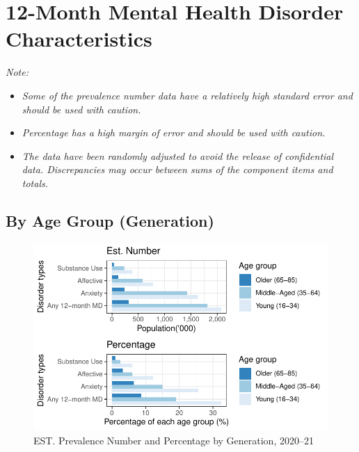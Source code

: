 \documentclass[
  a4paper,
  DIV=11,
  numbers=noendperiod]{scrreport}
\begin{document}
\hypertarget{month-mental-health-disorder-characteristics}{%
\section{12-Month Mental Health Disorder
Characteristics}\label{month-mental-health-disorder-characteristics}}

\emph{Note:}

\begin{itemize}
\item
  \emph{Some of the prevalence number data have a relatively high
  standard error and should be used with caution.}
\item
  \emph{Percentage has a high margin of error and should be used with
  caution.}
\item
  \emph{The data have been randomly adjusted to avoid the release of
  confidential data. Discrepancies may occur between sums of the
  component items and totals.}
\end{itemize}

\hypertarget{by-age-group-generation}{%
\subsection{By Age Group (Generation)}\label{by-age-group-generation}}

\begin{figure}

\caption{\label{fig-12ag}EST. Prevalence Number and Percentage by
Generation, 2020--21}

{\centering \includegraphics{./chap1-prevalence-of-md_files/figure-pdf/fig-12ag-1.pdf}

}

\end{figure}
\end{document}
